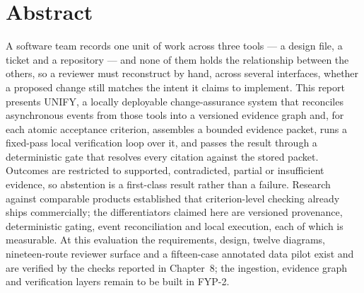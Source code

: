 \chapter*{Abstract}

A software team records one unit of work across three tools --- a design file, a
ticket and a repository --- and none of them holds the relationship between the
others, so a reviewer must reconstruct by hand, across several interfaces,
whether a proposed change still matches the intent it claims to implement. This
report presents UNIFY, a locally deployable change-assurance system that
reconciles asynchronous events from those tools into a versioned evidence graph
and, for each atomic acceptance criterion, assembles a bounded evidence packet,
runs a fixed-pass local verification loop over it, and passes the result through
a deterministic gate that resolves every citation against the stored packet.
Outcomes are restricted to supported, contradicted, partial or insufficient
evidence, so abstention is a first-class result rather than a failure. Research
against comparable products established that criterion-level checking already
ships commercially; the differentiators claimed here are versioned provenance,
deterministic gating, event reconciliation and local execution, each of which is
measurable. At this evaluation the requirements, design, twelve diagrams,
nineteen-route reviewer surface and a fifteen-case annotated data pilot exist
and are verified by the checks reported in Chapter~8; the ingestion, evidence
graph and verification layers remain to be built in FYP-2.

